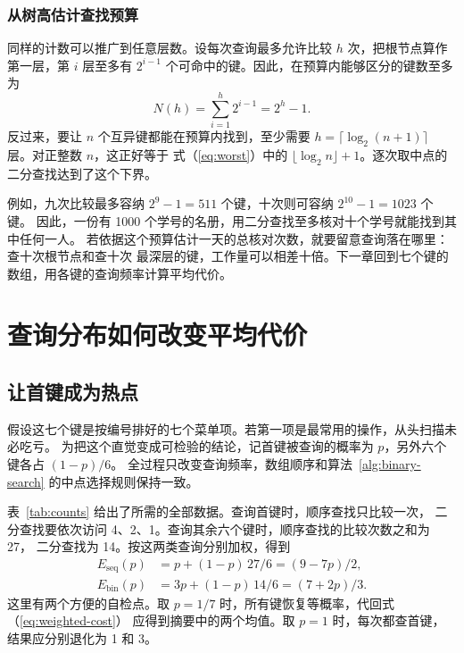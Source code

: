 \documentclass{fduthesis}
\begin{document}
\subsection{从树高估计查找预算}
同样的计数可以推广到任意层数。设每次查询最多允许比较 $h$ 次，把根节点算作
第一层，第 $i$ 层至多有 $2^{i-1}$ 个可命中的键。因此，在预算内能够区分的键数至多为
\begin{equation}
  N(h)=\sum_{i=1}^{h}2^{i-1}=2^h-1 .
  \label{eq:tree-capacity}
\end{equation}
反过来，要让 $n$ 个互异键都能在预算内找到，至少需要
$h=\lceil\log_2(n+1)\rceil$ 层。对正整数 $n$，这正好等于
式（\ref{eq:worst}）中的 $\lfloor\log_2 n\rfloor+1$。逐次取中点的二分查找达到了这个下界。

例如，九次比较最多容纳 $2^9-1=511$ 个键，十次则可容纳 $2^{10}-1=1023$ 个键。
因此，一份有 1000 个学号的名册，用二分查找至多核对十个学号就能找到其中任何一人。
若依据这个预算估计一天的总核对次数，就要留意查询落在哪里：查十次根节点和查十次
最深层的键，工作量可以相差十倍。下一章回到七个键的数组，用各键的查询频率计算平均代价。

\chapter{查询分布如何改变平均代价}
\section{让首键成为热点}
假设这七个键是按编号排好的七个菜单项。若第一项是最常用的操作，从头扫描未必吃亏。
为把这个直觉变成可检验的结论，记首键被查询的概率为 $p$，另外六个键各占 $(1-p)/6$。
全过程只改变查询频率，数组顺序和算法~\ref{alg:binary-search} 的中点选择规则保持一致。

表~\ref{tab:counts} 给出了所需的全部数据。查询首键时，顺序查找只比较一次，
二分查找要依次访问 4、2、1。查询其余六个键时，顺序查找的比较次数之和为 27，
二分查找为 14。按这两类查询分别加权，得到
\begin{equation}
  \begin{aligned}
    E_{\mathrm{seq}}(p) &= p + (1-p)\,27/6 = (9-7p)/2, \\
    E_{\mathrm{bin}}(p) &= 3p + (1-p)\,14/6 = (7+2p)/3 .
  \end{aligned}
  \label{eq:weighted-cost}
\end{equation}
这里有两个方便的自检点。取 $p=1/7$ 时，所有键恢复等概率，代回式（\ref{eq:weighted-cost}）
应得到摘要中的两个均值。取 $p=1$ 时，每次都查首键，结果应分别退化为 1 和 3。
\end{document}
